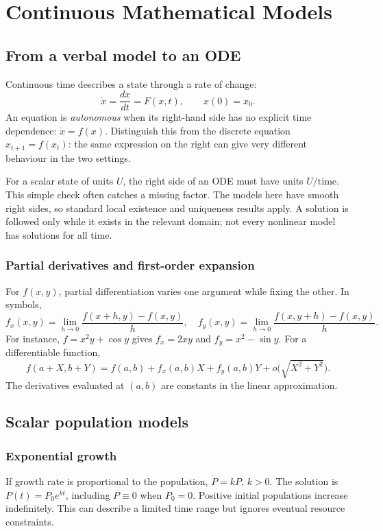 \chapter{Continuous Mathematical Models}\label{chap:applied-continuous}

\section{From a verbal model to an ODE}
Continuous time describes a state through a rate of change:
\[
\dot x=\frac{dx}{dt}=F(x,t),\qquad x(0)=x_0.
\]
An equation is \emph{autonomous} when its right-hand side has no explicit
time dependence: $\dot x=f(x)$. Distinguish this from the discrete equation
$x_{t+1}=f(x_t)$: the same expression on the right can give very different
behaviour in the two settings.

For a scalar state of units $U$, the right side of an ODE must have units
$U/\text{time}$. This simple check often catches a missing factor.
The models here have smooth right sides, so standard local existence and
uniqueness results apply. A solution is followed only while it exists in
the relevant domain; not every nonlinear model has solutions for all time.

\subsection{Partial derivatives and first-order expansion}
For $f(x,y)$, partial differentiation varies one argument while fixing the
other. In symbols,
\[
f_x(x,y)=\lim_{h\to0}\frac{f(x+h,y)-f(x,y)}h,
\quad
f_y(x,y)=\lim_{h\to0}\frac{f(x,y+h)-f(x,y)}h.
\]
For instance, $f=x^2y+\cos y$ gives $f_x=2xy$ and $f_y=x^2-\sin y$.
For a differentiable function,
\[
f(a+X,b+Y)=f(a,b)+f_x(a,b)X+f_y(a,b)Y
+o\bigl(\sqrt{X^2+Y^2}\bigr).
\]
The derivatives evaluated at $(a,b)$ are constants in the linear approximation.

\section{Scalar population models}
\subsection{Exponential growth}
If growth rate is proportional to the population, $\dot P=kP$, $k>0$.
The solution is $P(t)=P_0e^{kt}$, including $P\equiv0$ when $P_0=0$.
Positive initial populations increase indefinitely. This can describe a
limited time range but ignores eventual resource constraints.

